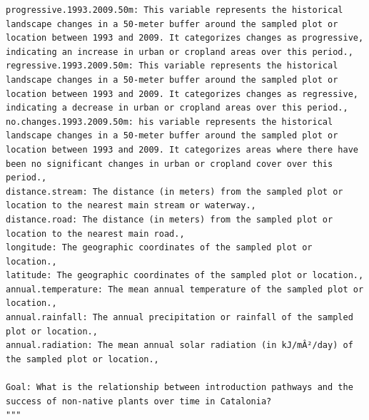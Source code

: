 \begin{verbatim}
progressive.1993.2009.50m: This variable represents the historical landscape changes in a 50-meter buffer around the sampled plot or location between 1993 and 2009. It categorizes changes as progressive, indicating an increase in urban or cropland areas over this period.,
regressive.1993.2009.50m: This variable represents the historical landscape changes in a 50-meter buffer around the sampled plot or location between 1993 and 2009. It categorizes changes as regressive, indicating a decrease in urban or cropland areas over this period.,
no.changes.1993.2009.50m: his variable represents the historical landscape changes in a 50-meter buffer around the sampled plot or location between 1993 and 2009. It categorizes areas where there have been no significant changes in urban or cropland cover over this period.,
distance.stream: The distance (in meters) from the sampled plot or location to the nearest main stream or waterway.,
distance.road: The distance (in meters) from the sampled plot or location to the nearest main road.,
longitude: The geographic coordinates of the sampled plot or location.,
latitude: The geographic coordinates of the sampled plot or location.,
annual.temperature: The mean annual temperature of the sampled plot or location.,
annual.rainfall: The annual precipitation or rainfall of the sampled plot or location.,
annual.radiation: The mean annual solar radiation (in kJ/mÂ²/day) of the sampled plot or location.,

Goal: What is the relationship between introduction pathways and the success of non-native plants over time in Catalonia?
"""
\end{verbatim}




